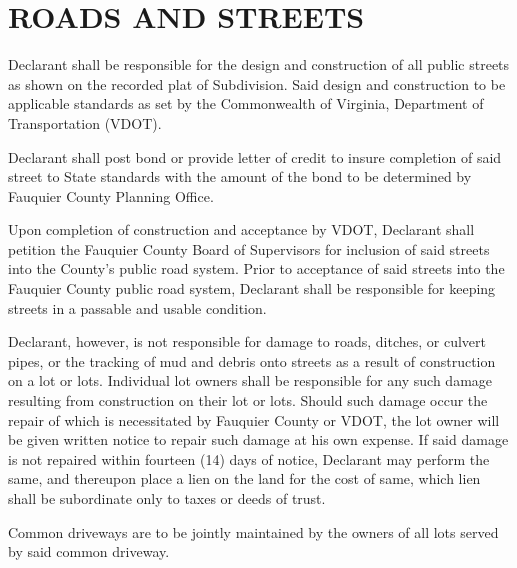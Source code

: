 \documentclass[10pt, letterpaper]{article}
\begin{document}
\section{ROADS AND STREETS}
Declarant shall be responsible for the design and construction of all public streets as shown on the recorded plat of Subdivision.
Said design and construction to be applicable standards as set by the Commonwealth of Virginia, Department of Transportation (VDOT).

Declarant shall post bond or provide letter of credit to insure completion of said street to State standards with the amount of the bond to be determined by Fauquier County Planning Office.

Upon completion of construction and acceptance by VDOT, Declarant shall petition the Fauquier County Board of Supervisors for inclusion of said streets into the County's public road system.
Prior to acceptance of said streets into the Fauquier County public road system, Declarant shall be responsible for keeping streets in a passable and usable condition.

Declarant, however, is not responsible for damage to roads, ditches, or culvert pipes, or the tracking of mud and debris onto streets as a result of construction on a lot or lots.
Individual lot owners shall be responsible for any such damage resulting from construction on their lot or lots.
Should such damage occur the repair of which is necessitated by Fauquier County or VDOT, the lot owner will be given written notice to repair such damage at his own expense.
If said damage is not repaired within fourteen (14) days of notice, Declarant may perform the same, and thereupon place a lien on the land for the cost of same, which lien shall be subordinate only to taxes or deeds of trust.

Common driveways are to be jointly maintained by the owners of all lots served by said common driveway.
\end{document}
